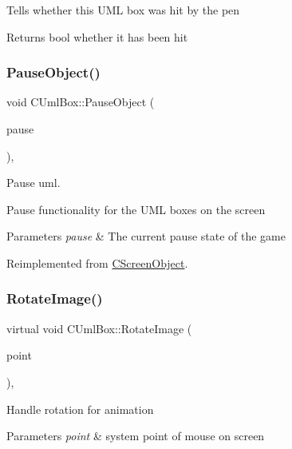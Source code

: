 Tells whether this U\+ML box was hit by the pen \begin{DoxyReturn}{Returns}
bool whether it has been hit 
\end{DoxyReturn}
\mbox{\label{class_c_uml_box_a49ddda6a0bbd7b224b743f83b2f7cb0c}} 
\subsubsection{\texorpdfstring{PauseObject()}{PauseObject()}}
{\footnotesize\ttfamily void C\+Uml\+Box\+::\+Pause\+Object (\begin{DoxyParamCaption}\item[{bool}]{pause }\end{DoxyParamCaption})\hspace{0.3cm}{\ttfamily [override]}, {\ttfamily [virtual]}}



Pause uml. 

Pause functionality for the U\+ML boxes on the screen 
\begin{DoxyParams}{Parameters}
{\em pause} & The current pause state of the game \\
\hline
\end{DoxyParams}


Reimplemented from \mbox{\hyperlink{class_c_screen_object_a584fe08e6bdd9efe0c2f06d6f1d53e70}{C\+Screen\+Object}}.

\mbox{\label{class_c_uml_box_aabcb2f2f611d6a99c0f71815ae4a1971}} 
\subsubsection{\texorpdfstring{RotateImage()}{RotateImage()}}
{\footnotesize\ttfamily virtual void C\+Uml\+Box\+::\+Rotate\+Image (\begin{DoxyParamCaption}\item[{C\+Point}]{point }\end{DoxyParamCaption})\hspace{0.3cm}{\ttfamily [inline]}, {\ttfamily [virtual]}}

Handle rotation for animation 
\begin{DoxyParams}{Parameters}
{\em point} & system point of mouse on screen \\
\hline
\end{DoxyParams}
\mbox{\label{class_c_uml_box_aaf5b357b669c38c2ed74cd157ddccb76}} 
